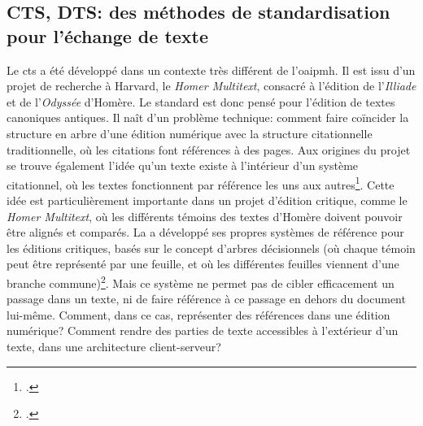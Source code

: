 \subsection{CTS, DTS: des méthodes de standardisation pour l'échange de texte}
Le \gls{cts} a été développé dans un contexte très différent de l'\gls{oaipmh}. Il est issu d'un projet de recherche à Harvard, le \textit{Homer Multitext}, consacré à l'édition de l'\textit{Illiade} et de l'\textit{Odyssée} d'Homère. Le standard est donc pensé pour l'édition de textes canoniques antiques. Il naît d'un problème technique: comment faire coïncider la structure en arbre d'une édition numérique avec la structure citationnelle traditionnelle, où les citations font références à des pages. Aux origines du projet se trouve également l'idée qu'un texte existe à l'intérieur d'un système citationnel, où les textes fonctionnent par référence les uns aux autres\footcite{smith_four_2012}. Cette idée est particulièrement importante dans un projet d'édition critique, comme le \textit{Homer Multitext}, où les différents témoins des textes d'Homère doivent pouvoir être alignés et comparés. La \tei{} a développé ses propres systèmes de référence pour les éditions critiques, basés sur le concept d'arbres décisionnels (où chaque témoin peut être représenté par une feuille, et où les différentes feuilles viennent d'une branche commune)\footcite{tei_consortium_p5_2022}. Mais ce système ne permet pas de cibler efficacement un passage dans un texte, ni de faire référence à ce passage en dehors du document lui-même. Comment, dans ce cas, représenter des références dans une édition numérique? Comment rendre des parties de texte accessibles à l'extérieur d'un texte, dans une architecture client-serveur? 

